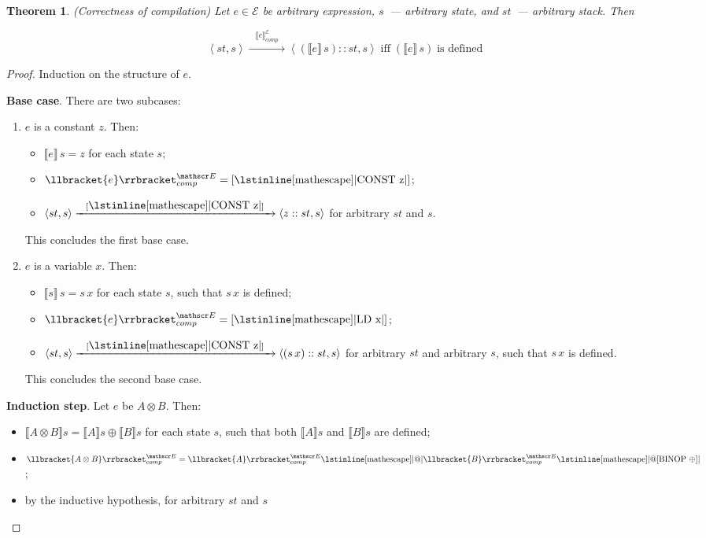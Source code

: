\documentclass{article}
\def\transarrow{\xrightarrow}
\def\padding{\phantom{X}}
\newcommand{\trans}[3]{{#1}\transarrow{\padding#2\padding}{#3}}
\newcommand{\llang}[1]{\mbox{\lstinline[mathescape]|#1|}}
\newcommand{\inbr}[1]{\left<{#1}\right>}
\newcommand{\sembr}[1]{\llbracket{#1}\rrbracket}
\newtheorem{theorem}{Theorem}
\theoremstyle{definition}
\begin{document}
\begin{theorem}(Correctness of compilation)
  Let $e\in\mathscr E$ be arbitrary expression, $s$~--- arbitrary state, and $st$~--- arbitrary stack. Then

  \[
    \trans{\inbr{st, s}}{\sembr{e}^{\mathscr E}_{comp}}{\inbr{(\sembr{e}\,s)::st, s}}\; \mbox{iff} \; (\sembr{e}\,s)\; \mbox{is defined}
  \]
\end{theorem}
\begin{proof}
  Induction on the structure of $e$.

  \textbf{Base case}. There are two subcases:

  \begin{enumerate}
  \item $e$ is a constant $z$. Then:
     \begin{itemize}
       \item $\sembr{e}\,s=z$ for each state $s$;
       \item \mbox{$\sembr{e}^{\mathscr E}_{comp}=[\llang{CONST z}]$};
       \item $\trans{\inbr{st, s}}{[\llang{CONST z}]}{\inbr{z::st, s}}$ for arbitrary $st$ and $s$.
     \end{itemize}

     This concludes the first base case.

   \item $e$ is a variable $x$. Then:
     \begin{itemize}
       \item $\sembr{s}\,s=s\,x$ for each state $s$, such that $s\,x$ is defined;
       \item \mbox{$\sembr{e}^{\mathscr E}_{comp}=[\llang{LD x}]$};
       \item $\trans{\inbr{st, s}}{[\llang{CONST z}]}{\inbr{(s\,x)::st, s}}$ for arbitrary $st$ and arbitrary $s$, such that $s\, x$ is defined.
     \end{itemize}

     This concludes the second base case.     
  \end{enumerate}

  \textbf{Induction step}. Let $e$ be $A\otimes B$. Then:

  \begin{itemize}
    \item $\sembr{A\otimes B}s=\sembr{A}s\oplus\sembr{B}s$ for each state $s$, such that both $\sembr{A}s$ and $\sembr{B}s$ are defined;
    \item $\sembr{A\otimes B}^{\mathscr E}_{comp}=\sembr{A}^{\mathscr E}_{comp}\llang{@}\sembr{B}^{\mathscr E}_{comp}\llang{@[BINOP $\oplus$]}$;
    \item by the inductive hypothesis, for arbitrary $st$ and $s$


\end{itemize}
\end{proof}
\end{document}
